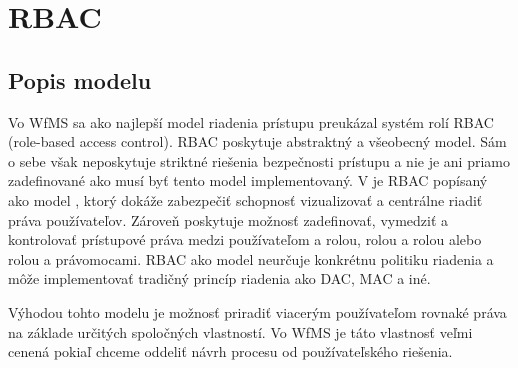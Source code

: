 \section{RBAC}
\subsection{Popis modelu}
Vo WfMS sa ako najlepší model riadenia prístupu preukázal systém rolí RBAC (role-based access control). RBAC poskytuje abstraktný a všeobecný model. Sám o sebe však neposkytuje striktné riešenia bezpečnosti prístupu a nie je ani priamo zadefinované ako musí byť tento model implementovaný. V \cite{ekonomika} je RBAC popísaný ako model , ktorý dokáže zabezpečiť schopnosť vizualizovať a centrálne riadiť práva používateľov. Zároveň poskytuje možnosť zadefinovať, vymedziť a kontrolovať prístupové práva medzi používateľom a rolou, rolou a rolou alebo rolou a právomocami. RBAC ako model neurčuje konkrétnu politiku riadenia a môže implementovať tradičný princíp riadenia ako DAC, MAC a iné. 

Výhodou tohto modelu je možnosť priradiť viacerým používateľom rovnaké práva na základe určitých spoločných vlastností. Vo WfMS je táto vlastnosť veľmi cenená pokiaľ chceme oddeliť návrh procesu od používateľského riešenia. 





